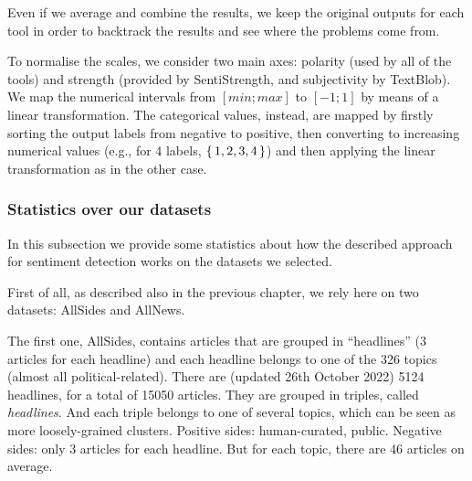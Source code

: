 

Even if we average and combine the results, we keep the original outputs for each tool in order to backtrack the results and see where the problems come from.

To normalise the scales, we consider two main axes: polarity (used by all of the tools) and strength (provided by SentiStrength, and subjectivity by TextBlob). We map the numerical intervals from $[min;max]$ to $[-1;1]$ by means of a linear transformation. The categorical values, instead, are mapped by firstly sorting the output labels from negative to positive, then converting to increasing numerical values (e.g., for 4 labels, $\set{1,2,3,4}$) and then applying the linear transformation as in the other case.

\subsubsection{\statusred Statistics over our datasets}
In this subsection we provide some statistics about how the described approach for sentiment detection works on the datasets we selected.

First of all, as described also in the previous chapter, we rely here on two datasets: AllSides and AllNews.

The first one, AllSides, contains articles that are grouped in “headlines” (3 articles for each headline) and each headline belongs to one of the 326 topics (almost all political-related). There are (updated 26th October 2022) 5124 headlines, for a total of 15050 articles. They are grouped in triples, called \emph{headlines}. And each triple belongs to one of several topics, which can be seen as more loosely-grained clusters. Positive sides: human-curated, public. Negative sides: only 3 articles for each headline. But for each topic, there are 46 articles on average.

